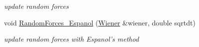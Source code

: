 \begin{CompactItemize}
\begin{CompactList}\small\item\em update random forces \item\end{CompactList}\item 
\hypertarget{classInteraction_90f82e85aeec6d1d2ee4229f18049bd8}{
void \hyperlink{classInteraction_90f82e85aeec6d1d2ee4229f18049bd8}{RandomForces\_\-Espanol} (\hyperlink{classWiener}{Wiener} \&wiener, double sqrtdt)}
\label{classInteraction_90f82e85aeec6d1d2ee4229f18049bd8}

\begin{CompactList}\small\item\em update random forces with Espanol's method \item\end{CompactList}\end{CompactItemize}
